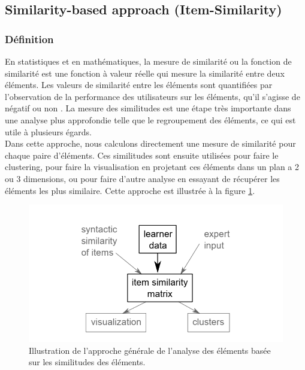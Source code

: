 \subsection{Similarity-based approach (Item-Similarity)}
\subsubsection{Définition}
En statistiques et en mathématiques, la mesure de similarité ou la fonction de similarité est une fonction à valeur réelle qui mesure la similarité entre deux éléments. Les valeurs de similarité entre les éléments sont quantifiées par l'observation de la performance des utilisateurs sur les éléments, qu'il s'agisse de négatif ou non \cite{nithya2017calculating}. La mesure des similitudes est une étape très importante dans une analyse plus approfondie telle que le regroupement des éléments, ce qui est utile à plusieurs égards. \cite{pelanek2018measuring}  \\
Dans cette approche, nous calculons directement une mesure de similarité pour chaque paire d'éléments. Ces similitudes sont ensuite utilisées pour faire le clustering, pour faire la visualisation en projetant ces éléments dans un plan a 2 ou 3 dimensions, ou pour faire d’autre analyse en essayant de récupérer les éléments les plus similaire. Cette approche est illustrée à la figure \ref{illustration_item_similarity}. 

\begin{figure}[H]
	\begin{center}
		\includegraphics[width=\textwidth]{images/chapitre3/Illustration_item_smilarity.png}
	\end{center}
\caption{Illustration de l'approche générale de l'analyse des éléments basée sur les similitudes des éléments.}
\label{illustration_item_similarity}
\end{figure}

